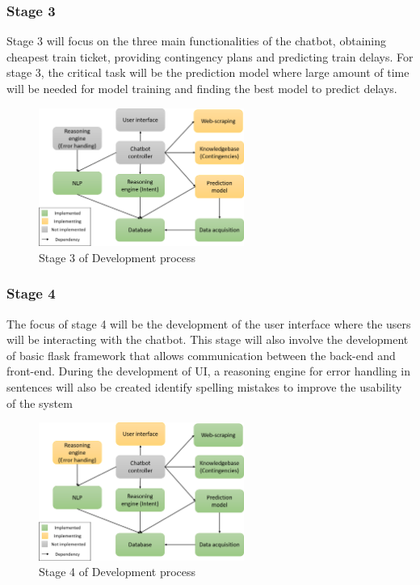 \documentclass[11pt]{article}
\begin{document}
\subsubsection{Stage 3}
Stage 3 will focus on the three main functionalities of the chatbot, obtaining cheapest train ticket, providing contingency plans and predicting train delays. For stage 3, the critical task will be the prediction model where large amount of time will be needed for model training and finding the best model to predict delays.
\begin{figure}[!htb]
	\centering
	\includegraphics[width=0.6\textwidth]{Stage_3}
	\caption{Stage 3 of Development process }\label{fig:Stage 3}
\end{figure}

\subsubsection{Stage 4}
The focus of stage 4 will be the development of the user interface where the users will be interacting with the chatbot. This stage will also involve the development of basic flask framework that allows communication between the back-end and front-end. During the development of UI, a reasoning engine for error handling in sentences will also be created identify spelling mistakes to improve the usability of the system
\begin{figure}[!htb]
	\centering
	\includegraphics[width=0.6\textwidth]{Stage_4}
	\caption{Stage 4 of Development process }\label{fig:Stage 4}
\end{figure}
\end{document}
